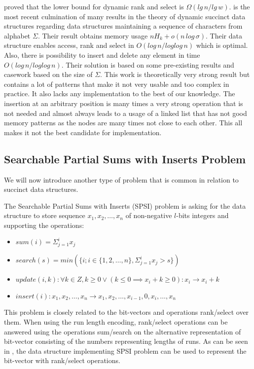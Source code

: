 \cite{beame2002optimal} proved that the lower bound for dynamic rank and select is $\Omega(lg\,n/lg\,w)$. \cite{munro2015compressed} is the most recent culmination of many results in the theory of dynamic succinct data structures regarding data structures maintaining a sequence of characters from alphabet $\Sigma$. Their result obtains memory usage $nH_k+o(n\,log\,\sigma)$. Their data structure enables access, rank and select in $O(log\,n/log log\,n)$ which is optimal. Also, there is possibility to insert and delete any element in time $O(log\,n/log log\,n)$. Their solution is based on some pre-existing results and casework based on the size of $\Sigma$. This work is theoretically very strong result but contains a lot of patterns that make it not very usable and too complex in practice. It also lacks any implementation to the best of our knowledge. The insertion at an arbitrary position is many times a very strong operation that is not needed and almost always leads to a usage of a linked list that has not good memory patterns as the nodes are many times not close to each other. This all makes it not the best candidate for implementation.

\subsection{Searchable Partial Sums with Inserts Problem}

We will now introduce another type of problem that is common in relation to succinct data structures.

\begin{definition}
The Searchable Partial Sums with Inserts (SPSI) problem is asking for the data structure to
store sequence $x_1, x_2, \ldots , x_n$ of non-negative $l$-bits integers and supporting the operations:
\begin{itemize}
    \item $sum(i) = \Sigma_{j=1}^{i} x_j$
    \item $search(s) = min(\{i; i\in \{1, 2,\ldots, n\}, \Sigma_{j=1}^{i} x_j > s \})$
    \item $update(i, k): \forall k \in Z, k \geq 0 \lor (k\leq 0 \implies x_i + k \geq 0): x_i \rightarrow x_i + k$
    \item $insert(i): x_1, x_2,\ldots, x_n \rightarrow x_1, x_2,\ldots , x_{i-1}, 0, x_{i}, \ldots , x_n$
\end{itemize}
\end{definition}

This problem is closely related to the bit-vectors and operations rank/select over them. When using the run length encoding, rank/select operations can be answered using the operations sum/search on the alternative representation of bit-vector consisting of the numbers representing lengths of runs. As can be seen in \cite{prezza2017framework}, the data structure implementing SPSI problem can be used to represent the bit-vector with rank/select operations.

